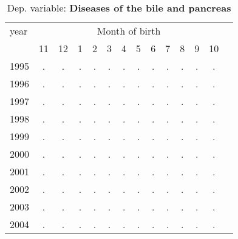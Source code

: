  \begin{table}[H] \begin{threeparttable} \centering \caption{Dep. variable: \textbf{Diseases of the bile and pancreas}} {\def\sym#1{\ifmmode^{#1}\else\(^{#1}\)\fi} \begin{tabular}{l*{13}{c}} \toprule year & \multicolumn{12}{c}{Month of birth} \\ \cmidrule(lr){2-13} 
            &          11&          12&           1&           2&           3&           4&           5&           6&           7&           8&           9&          10\\
1995        &           .&           .&           .&           .&           .&           .&           .&           .&           .&           .&           .&           .\\
1996        &           .&           .&           .&           .&           .&           .&           .&           .&           .&           .&           .&           .\\
1997        &           .&           .&           .&           .&           .&           .&           .&           .&           .&           .&           .&           .\\
1998        &           .&           .&           .&           .&           .&           .&           .&           .&           .&           .&           .&           .\\
1999        &           .&           .&           .&           .&           .&           .&           .&           .&           .&           .&           .&           .\\
2000        &           .&           .&           .&           .&           .&           .&           .&           .&           .&           .&           .&           .\\
2001        &           .&           .&           .&           .&           .&           .&           .&           .&           .&           .&           .&           .\\
2002        &           .&           .&           .&           .&           .&           .&           .&           .&           .&           .&           .&           .\\
2003        &           .&           .&           .&           .&           .&           .&           .&           .&           .&           .&           .&           .\\
2004        &           .&           .&           .&           .&           .&           .&           .&           .&           .&           .&           .&           .\\

\end{tabular}}
\end{threeparttable}
\end{table}
